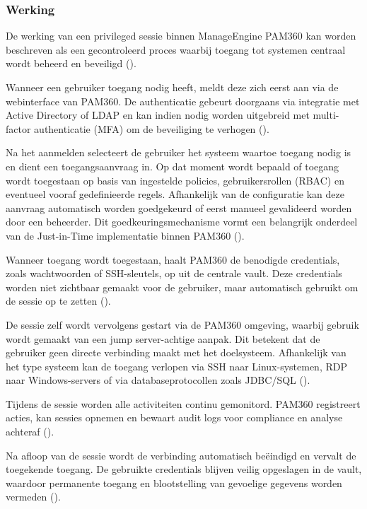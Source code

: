 \subsubsection{Werking}
De werking van een privileged sessie binnen ManageEngine PAM360 kan worden beschreven als een gecontroleerd proces waarbij toegang tot systemen centraal wordt beheerd en beveiligd (\cite{pam360_architecture}).

Wanneer een gebruiker toegang nodig heeft, meldt deze zich eerst aan via de webinterface van PAM360. De authenticatie gebeurt doorgaans via integratie met Active Directory of LDAP en kan indien nodig worden uitgebreid met multi-factor authenticatie (MFA) om de beveiliging te verhogen (\cite{pam360_architecture}).

Na het aanmelden selecteert de gebruiker het systeem waartoe toegang nodig is en dient een toegangsaanvraag in. Op dat moment wordt bepaald of toegang wordt toegestaan op basis van ingestelde policies, gebruikersrollen (RBAC) en eventueel vooraf gedefinieerde regels. Afhankelijk van de configuratie kan deze aanvraag automatisch worden goedgekeurd of eerst manueel gevalideerd worden door een beheerder. Dit goedkeuringsmechanisme vormt een belangrijk onderdeel van de Just-in-Time implementatie binnen PAM360 (\cite{pam360_architecture,nist2020}).

Wanneer toegang wordt toegestaan, haalt PAM360 de benodigde credentials, zoals wachtwoorden of SSH-sleutels, op uit de centrale vault. Deze credentials worden niet zichtbaar gemaakt voor de gebruiker, maar automatisch gebruikt om de sessie op te zetten (\cite{pam360_architecture}).

De sessie zelf wordt vervolgens gestart via de PAM360 omgeving, waarbij gebruik wordt gemaakt van een jump server-achtige aanpak. Dit betekent dat de gebruiker geen directe verbinding maakt met het doelsysteem. Afhankelijk van het type systeem kan de toegang verlopen via SSH naar Linux-systemen, RDP naar Windows-servers of via databaseprotocollen zoals JDBC/SQL (\cite{pam360_architecture}).

Tijdens de sessie worden alle activiteiten continu gemonitord. PAM360 registreert acties, kan sessies opnemen en bewaart audit logs voor compliance en analyse achteraf (\cite{pam360_architecture}).

Na afloop van de sessie wordt de verbinding automatisch beëindigd en vervalt de toegekende toegang. De gebruikte credentials blijven veilig opgeslagen in de vault, waardoor permanente toegang en blootstelling van gevoelige gegevens worden vermeden (\cite{pam360_architecture,nist2020}).

